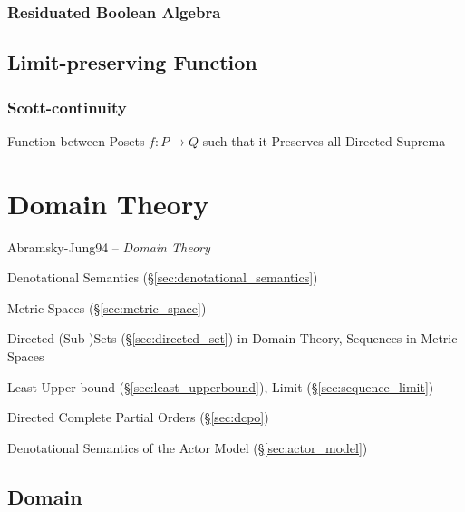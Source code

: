 \subsubsection{Residuated Boolean Algebra}
\label{sec:residuated_boolean_algebra}



\subsection{Limit-preserving Function}\label{sec:limit_preserving}

\subsubsection{Scott-continuity}\label{sec:scott_continuity}

Function between Posets $f : P \rightarrow Q$ such that it Preserves
all Directed Suprema %



\section{Domain Theory}\label{sec:domain_theory}


Abramsky-Jung94 -- \emph{Domain Theory}

Denotational Semantics (\S\ref{sec:denotational_semantics})

Metric Spaces (\S\ref{sec:metric_space})

Directed (Sub-)Sets (\S\ref{sec:directed_set}) in Domain Theory,
Sequences in Metric Spaces

Least Upper-bound (\S\ref{sec:least_upperbound}), Limit
(\S\ref{sec:sequence_limit})

Directed Complete Partial Orders (\S\ref{sec:dcpo})

Denotational Semantics of the Actor Model (\S\ref{sec:actor_model})



\subsection{Domain}\label{sec:order_domain}

